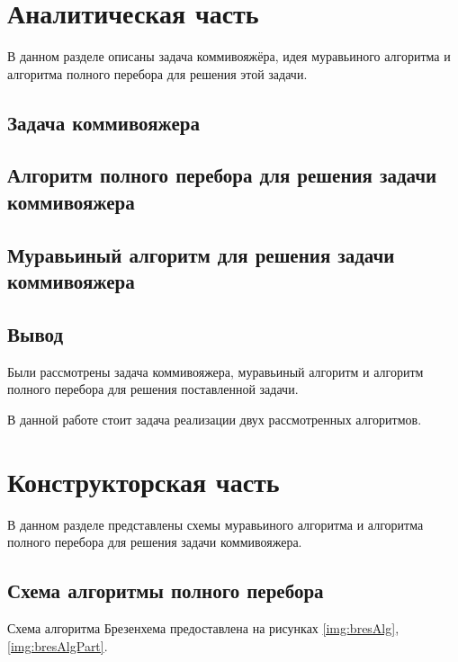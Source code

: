 \documentclass[12pt]{report}
\begin{document}
\chapter{Аналитическая часть}
В данном разделе описаны задача коммивояжёра, идея муравьиного алгоритма и алгоритма полного перебора для решения этой задачи.

\section{Задача коммивояжера}

\section{Алгоритм полного перебора для решения задачи коммивояжера}

\section{Муравьиный алгоритм для решения задачи коммивояжера}

\section*{Вывод}
Были рассмотрены задача коммивояжера, муравьиный алгоритм и алгоритм полного перебора для решения поставленной задачи.

В данной работе стоит задача реализации двух рассмотренных алгоритмов.

\chapter{Конструкторская часть}
В данном разделе представлены схемы муравьиного алгоритма и алгоритма полного перебора для решения задачи коммивояжера.
\section{Схема алгоритмы полного перебора}
Схема алгоритма Брезенхема предоставлена на рисунках \ref{img:bresAlg}, \ref{img:bresAlgPart}.
\end{document}
